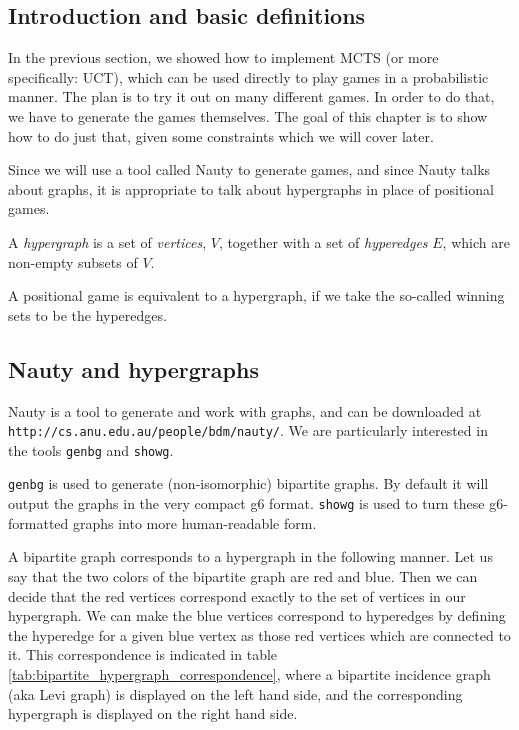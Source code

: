 \subsection{Introduction and basic definitions}

In the previous section, we showed how to implement MCTS (or more specifically: UCT), which can be used directly to play games in a probabilistic manner.
The plan is to try it out on many different games.
In order to do that, we have to generate the games themselves.
The goal of this chapter is to show how to do just that, given some constraints which we will cover later.

Since we will use a tool called Nauty to generate games, and since Nauty talks about graphs, it is appropriate to talk about hypergraphs in place of positional games.

\begin{definition}
  A \emph{hypergraph} is a set of \emph{vertices}, $V$, together with a set of \emph{hyperedges} $E$, which are non-empty subsets of $V$.
\end{definition}

A positional game is equivalent to a hypergraph, if we take the so-called winning sets to be the hyperedges.

\subsection{Nauty and hypergraphs}


Nauty is a tool to generate and work with graphs, and can be downloaded at \texttt{http://cs.anu.edu.au/people/bdm/nauty/}.
We are particularly interested in the tools \texttt{genbg} and \texttt{showg}.

\texttt{genbg} is used to generate (non-isomorphic) bipartite graphs. By default it will output the graphs in the very compact g6 format.
\texttt{showg} is used to turn these g6-formatted graphs into more human-readable form.

A bipartite graph corresponds to a hypergraph in the following manner.
Let us say that the two colors of the bipartite graph are red and blue. Then we can decide that the red vertices correspond exactly to the set of vertices in our hypergraph.
We can make the blue vertices correspond to hyperedges by defining the hyperedge for a given blue vertex as those red vertices which are connected to it.
This correspondence is indicated in table \ref{tab:bipartite_hypergraph_correspondence}, where a bipartite incidence graph (aka Levi graph) is displayed on the left hand side, and the corresponding hypergraph is displayed on the right hand side.


